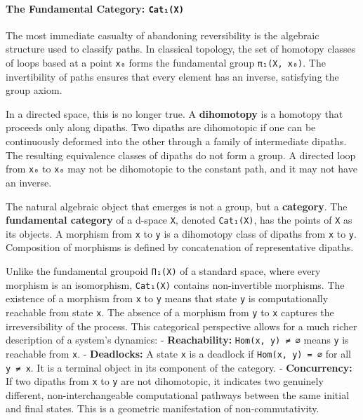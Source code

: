 \documentclass[
]{article}
\begin{document}
\paragraph{\texorpdfstring{The Fundamental Category:
\texttt{Cat₁(X)}}{The Fundamental Category: Cat₁(X)}}\label{the-fundamental-category-catux2081x}

The most immediate casualty of abandoning reversibility is the algebraic
structure used to classify paths. In classical topology, the set of
homotopy classes of loops based at a point \texttt{x₀} forms the
fundamental group \texttt{π₁(X,\ x₀)}. The invertibility of paths
ensures that every element has an inverse, satisfying the group axiom.

In a directed space, this is no longer true. A \textbf{dihomotopy} is a
homotopy that proceeds only along dipaths. Two dipaths are dihomotopic
if one can be continuously deformed into the other through a family of
intermediate dipaths. The resulting equivalence classes of dipaths do
not form a group. A directed loop from \texttt{x₀} to \texttt{x₀} may
not be dihomotopic to the constant path, and it may not have an inverse.

The natural algebraic object that emerges is not a group, but a
\textbf{category}. The \textbf{fundamental category} of a d-space
\texttt{X}, denoted \texttt{Cat₁(X)}, has the points of \texttt{X} as
its objects. A morphism from \texttt{x} to \texttt{y} is a dihomotopy
class of dipaths from \texttt{x} to \texttt{y}. Composition of morphisms
is defined by concatenation of representative dipaths.

Unlike the fundamental groupoid \texttt{Π₁(X)} of a standard space,
where every morphism is an isomorphism, \texttt{Cat₁(X)} contains
non-invertible morphisms. The existence of a morphism from \texttt{x} to
\texttt{y} means that state \texttt{y} is computationally reachable from
state \texttt{x}. The absence of a morphism from \texttt{y} to
\texttt{x} captures the irreversibility of the process. This categorical
perspective allows for a much richer description of a system's dynamics:
- \textbf{Reachability:} \texttt{Hom(x,\ y)\ ≠\ ∅} means \texttt{y} is
reachable from \texttt{x}. - \textbf{Deadlocks:} A state \texttt{x} is a
deadlock if \texttt{Hom(x,\ y)\ =\ ∅} for all \texttt{y\ ≠\ x}. It is a
terminal object in its component of the category. -
\textbf{Concurrency:} If two dipaths from \texttt{x} to \texttt{y} are
not dihomotopic, it indicates two genuinely different,
non-interchangeable computational pathways between the same initial and
final states. This is a geometric manifestation of non-commutativity.
\end{document}
